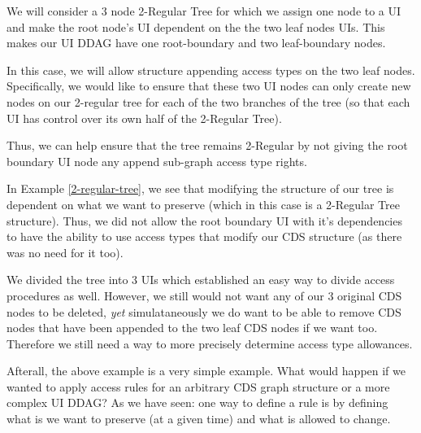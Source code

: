 \begin{con-ex} 
	\label{2-regular-tree}
	We will consider a 3 node 2-Regular Tree for which we assign one node to a UI and make the root node's UI dependent on the the two leaf nodes UIs. This makes our UI DDAG have one root-boundary and two leaf-boundary nodes.


In this case, we will allow structure appending access types on the two leaf nodes. Specifically, we would like to ensure that these two UI nodes can only create new nodes on our 2-regular tree for each of the two branches of the tree (so that each UI has control over its own half of the 2-Regular Tree).

Thus, we can help ensure that the tree remains 2-Regular by not giving the root boundary UI node any append sub-graph access type rights.
\end{con-ex}

In Example \ref{2-regular-tree}, we see that modifying the structure of our tree is dependent on what we want to preserve (which in this case is a 2-Regular Tree structure). Thus, we did not allow the root boundary UI with it's dependencies to have the ability to use access types that modify our CDS structure (as there was no need for it too).

We divided the tree into 3 UIs which established an easy way to divide access procedures as well. However, we still would not want any of our 3 original CDS nodes to be deleted, \textit{yet} simulataneously we do want to be able to remove CDS nodes that have been appended to the two leaf CDS nodes if we want too. Therefore we still need a way to more precisely determine access type allowances.

Afterall, the above example is a very simple example. What would happen if we wanted to apply access rules for an arbitrary CDS graph structure or a more complex UI DDAG? As we have seen: one way to define a rule is by defining what is we want to preserve (at a given time) and what is allowed to change.

